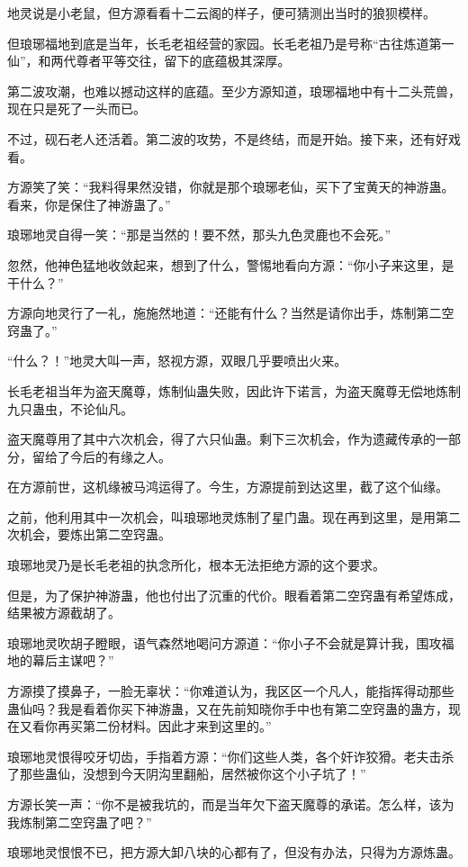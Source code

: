 \begin{this_body}
地灵说是小老鼠，但方源看看十二云阁的样子，便可猜测出当时的狼狈模样。

但琅琊福地到底是当年，长毛老祖经营的家园。长毛老祖乃是号称“古往炼道第一仙”，和两代尊者平等交往，留下的底蕴极其深厚。

第二波攻潮，也难以撼动这样的底蕴。至少方源知道，琅琊福地中有十二头荒兽，现在只是死了一头而已。

不过，砚石老人还活着。第二波的攻势，不是终结，而是开始。接下来，还有好戏看。

方源笑了笑：“我料得果然没错，你就是那个琅琊老仙，买下了宝黄天的神游蛊。看来，你是保住了神游蛊了。”

琅琊地灵自得一笑：“那是当然的！要不然，那头九色灵鹿也不会死。”

忽然，他神色猛地收敛起来，想到了什么，警惕地看向方源：“你小子来这里，是干什么？”

方源向地灵行了一礼，施施然地道：“还能有什么？当然是请你出手，炼制第二空窍蛊了。”

“什么？！”地灵大叫一声，怒视方源，双眼几乎要喷出火来。

长毛老祖当年为盗天魔尊，炼制仙蛊失败，因此许下诺言，为盗天魔尊无偿地炼制九只蛊虫，不论仙凡。

盗天魔尊用了其中六次机会，得了六只仙蛊。剩下三次机会，作为遗藏传承的一部分，留给了今后的有缘之人。

在方源前世，这机缘被马鸿运得了。今生，方源提前到达这里，截了这个仙缘。

之前，他利用其中一次机会，叫琅琊地灵炼制了星门蛊。现在再到这里，是用第二次机会，要炼出第二空窍蛊。

琅琊地灵乃是长毛老祖的执念所化，根本无法拒绝方源的这个要求。

但是，为了保护神游蛊，他也付出了沉重的代价。眼看着第二空窍蛊有希望炼成，结果被方源截胡了。

琅琊地灵吹胡子瞪眼，语气森然地喝问方源道：“你小子不会就是算计我，围攻福地的幕后主谋吧？”

方源摸了摸鼻子，一脸无辜状：“你难道认为，我区区一个凡人，能指挥得动那些蛊仙吗？我是看着你买下神游蛊，又在先前知晓你手中也有第二空窍蛊的蛊方，现在又看你再买第二份材料。因此才来到这里的。”

琅琊地灵恨得咬牙切齿，手指着方源：“你们这些人类，各个奸诈狡猾。老夫击杀了那些蛊仙，没想到今天阴沟里翻船，居然被你这个小子坑了！”

方源长笑一声：“你不是被我坑的，而是当年欠下盗天魔尊的承诺。怎么样，该为我炼制第二空窍蛊了吧？”

琅琊地灵恨恨不已，把方源大卸八块的心都有了，但没有办法，只得为方源炼蛊。

\end{this_body}

